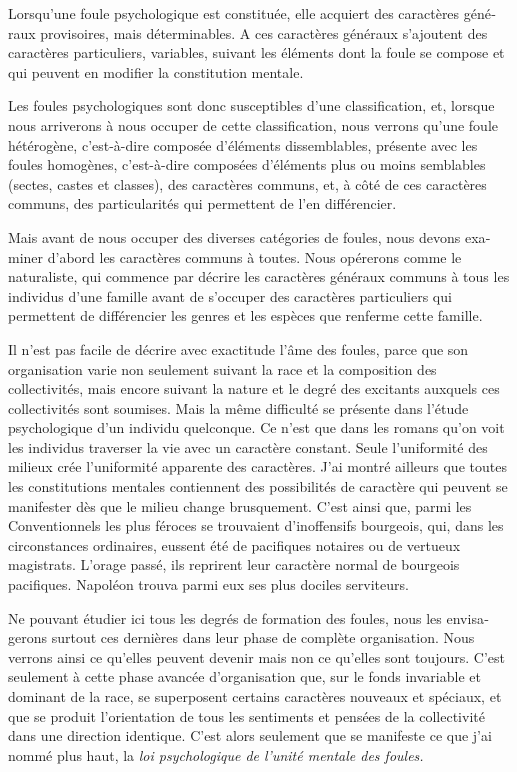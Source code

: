 \documentclass[french,twoside]{book} %
\begin{document}
Lorsqu’une foule psychologique est constituée, elle acquiert des caractères géné­raux provisoires, mais déterminables. A ces caractères généraux s’ajoutent des carac­tères particuliers, variables, suivant les éléments dont la foule se compose et qui peuvent en modifier la constitution mentale.\par
Les foules psychologiques sont donc susceptibles d’une classification, et, lorsque nous arriverons à nous occuper de cette classification, nous verrons qu’une foule hété­rogène, c’est-à-dire composée d’éléments dissemblables, présente avec les foules homogènes, c’est-à-dire composées d’éléments plus ou moins semblables (sectes, castes et classes), des caractères communs, et, à côté de ces caractères communs, des particularités qui permettent de l’en différencier.\par
Mais avant de nous occuper des diverses catégories de foules, nous devons exa­miner d’abord les caractères communs à toutes. Nous opérerons comme le naturaliste, qui commence par décrire les caractères généraux communs à tous les individus d’une famille avant de s’occuper des caractères particuliers qui permettent de différencier les genres et les espèces que renferme cette famille.\par
Il n’est pas facile de décrire avec exactitude l’âme des foules, parce que son organisation varie non seulement suivant la race et la composition des collectivités, mais encore suivant la nature et le degré des excitants auxquels ces collectivités sont soumises. Mais la même difficulté se présente dans l’étude psychologique d’un individu quelconque. Ce n’est que dans les romans qu’on voit les individus traverser la vie avec un caractère constant. Seule l’uniformité des milieux crée l’uniformité apparente des caractères. J’ai montré ailleurs que toutes les constitutions mentales contiennent des possibilités de caractère qui peuvent se manifester dès que le milieu change brusquement. C’est ainsi que, parmi les Conventionnels les plus féroces se trouvaient d’inoffensifs bourgeois, qui, dans les circonstances ordinaires, eussent été de pacifiques notaires ou de vertueux magistrats. L’orage passé, ils reprirent leur caractère normal de bourgeois pacifiques. Napoléon trouva parmi eux ses plus dociles serviteurs.\par
Ne pouvant étudier ici tous les degrés de formation des foules, nous les envisa­gerons surtout ces dernières dans leur phase de complète organisation. Nous verrons ainsi ce qu’elles peuvent devenir mais non ce qu’elles sont toujours. C’est seulement à cette phase avancée d’organisation que, sur le fonds invariable et dominant de la race, se superposent certains caractères nouveaux et spéciaux, et que se produit l’orientation de tous les sentiments et pensées de la collectivité dans une direction identique. C’est alors seulement que se manifeste ce que j’ai nommé plus haut, la \emph{loi psychologique de l’unité mentale des foules.}\par
\end{document}
